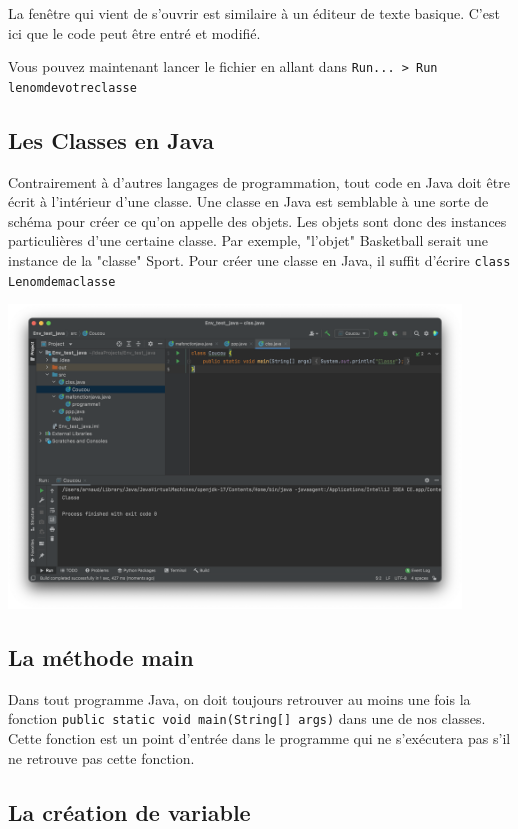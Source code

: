 La fenêtre qui vient de s'ouvrir est similaire à un éditeur de texte basique. C'est ici que le code peut être entré et modifié.

Vous pouvez maintenant lancer le fichier en allant dans \lstinline{Run... > Run lenomdevotreclasse}

\subsection{Les Classes en Java}

Contrairement à d'autres langages de programmation, tout code en Java doit être écrit à l'intérieur d'une classe. Une classe en Java est semblable à une sorte de schéma pour créer ce qu'on appelle des objets. Les objets sont donc des instances particulières d'une certaine classe. Par exemple, "l'objet" Basketball serait une instance de la "classe" Sport. Pour créer une classe en Java, il suffit d'écrire \lstinline{class Lenomdemaclasse}

\begin{center}
	\includegraphics[width=12cm]{clss}	
\end{center}

\subsection{La méthode main}
Dans tout programme Java, on doit toujours retrouver au moins une fois la fonction \lstinline{public static void main(String[] args)} dans une de nos classes. Cette fonction est un point d'entrée dans le programme qui ne s'exécutera pas s'il ne retrouve pas cette fonction.
\subsection{La création de variable}

